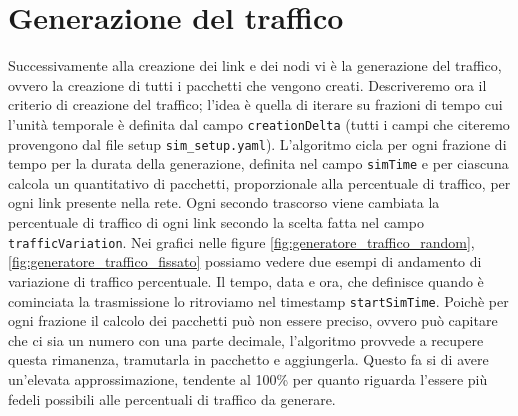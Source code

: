 \documentclass[binding=0.6cm]{sapthesis}
\begin{document}
\section{Generazione del traffico}
Successivamente alla creazione dei link e dei nodi vi è la generazione del traffico, ovvero la creazione di tutti i pacchetti che vengono
creati. Descriveremo ora il criterio di creazione del traffico; l'idea è quella di iterare su frazioni di tempo cui l'unità temporale è definita
 dal campo \texttt{creationDelta} (tutti i campi che citeremo provengono dal file setup \texttt{sim\_setup.yaml}). L'algoritmo cicla per ogni frazione di 
 tempo per la durata della generazione, definita nel campo
 \texttt{simTime} e per ciascuna calcola un quantitativo di pacchetti, proporzionale alla 
percentuale di traffico, per ogni link presente nella rete. Ogni secondo trascorso viene cambiata la percentuale di traffico di ogni link secondo
la scelta fatta nel campo \texttt{trafficVariation}. Nei grafici nelle figure \ref{fig:generatore_traffico_random}, \ref{fig:generatore_traffico_fissato} possiamo vedere due esempi di andamento di variazione di traffico percentuale.
Il tempo, data e ora, che definisce quando è cominciata la trasmissione lo ritroviamo nel timestamp \texttt{startSimTime}.
Poichè per ogni frazione il calcolo dei pacchetti può non essere preciso, ovvero può capitare che ci sia un numero con una parte decimale, l'algoritmo
provvede a recupere questa rimanenza, tramutarla in pacchetto e aggiungerla. Questo fa si di avere un'elevata approssimazione, tendente al 100\% per
quanto riguarda l'essere più fedeli possibili alle percentuali di traffico da generare.
\end{document}
